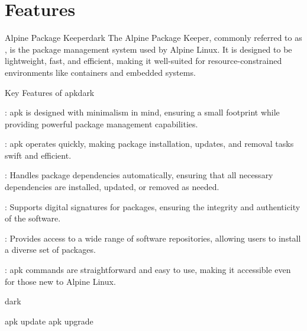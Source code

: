 \section{Features}
\label{Features}

\label{Alpine Package Keeper}
\begin{baseBoxThree}{Alpine Package Keeper}{dark}
    \bigskip
    The Alpine Package Keeper, commonly referred to as , is the package management system used by Alpine Linux.
    It is designed to be lightweight, fast, and efficient, making it well-suited for resource-constrained environments like containers and embedded systems.
    \bigskip
    \begin{baseBoxThree}{Key Features of apk}{dark}
        \begin{posnexItemize} 
            \smallskip
            \item[\sA] : apk is designed with minimalism in mind, ensuring a small footprint while providing powerful package management capabilities. \item[\sA] : apk operates quickly, making package installation, updates, and removal tasks swift and efficient. \item[\sA] : Handles package dependencies automatically, ensuring that all necessary dependencies are installed, updated, or removed as needed. \item[\sA] : Supports digital signatures for packages, ensuring the integrity and authenticity of the software. \item[\sA] : Provides access to a wide range of software repositories, allowing users to install a diverse set of packages. \item[\sA] : apk commands are straightforward and easy to use, making it accessible even for those new to Alpine Linux. \end{posnexItemize}
            \smallskip
    \end{baseBoxThree}
    \smallskip
    \begin{baseBoxThree}{}{dark}
        \begin{posnex}
            apk update
            apk upgrade
        \end{posnex}
    \end{baseBoxThree}
    \smallskip
\end{baseBoxThree}

